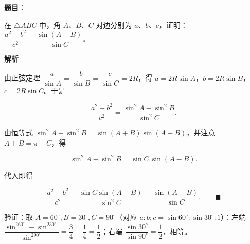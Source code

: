 \begin{answer}

\textbf{题目}：

在 $\triangle ABC$ 中，角 $A$、$B$、$C$ 对边分别为 $a$、$b$、$c$，证明：$\dfrac{a^2 - b^2}{c^2} = \dfrac{\sin(A - B)}{\sin C}$．

\textbf{解析}

由正弦定理 $\dfrac{a}{\sin A}=\dfrac{b}{\sin B}=\dfrac{c}{\sin C}=2R$，得 $a=2R\sin A$，$b=2R\sin B$，$c=2R\sin C$。于是

\nopagebreak[4]
\[\frac{a^2-b^2}{c^2}=\frac{\sin^2A-\sin^2B}{\sin^2C}.\]

由恒等式 $\sin^2A-\sin^2B=\sin(A+B)\sin(A-B)$，并注意 $A+B=\pi-C$，得

\nopagebreak[4]
\[\sin^2A-\sin^2B=\sin C\,\sin(A-B).\]

代入即得

\nopagebreak[4]
\[\frac{a^2-b^2}{c^2}=\frac{\sin C\sin(A-B)}{\sin^2C}=\frac{\sin(A-B)}{\sin C}. \qquad\blacksquare\]

验证：取 $A=60^\circ,B=30^\circ,C=90^\circ$（对应 $a:b:c=\sin60^\circ:\sin30^\circ:1$）：左端 $\dfrac{\sin^260^\circ-\sin^230^\circ}{\sin^290^\circ}=\dfrac34-\dfrac14=\dfrac12$；右端 $\dfrac{\sin30^\circ}{\sin90^\circ}=\dfrac12$，相等。


\par\medskip

\end{answer}
